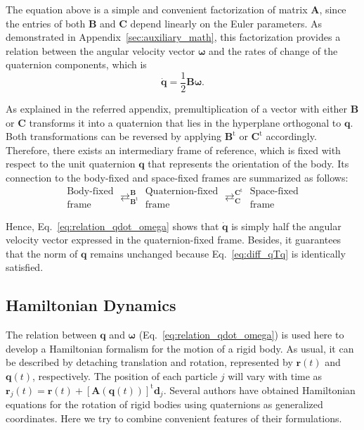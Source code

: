 \documentclass[aip,jcp,reprint,amsmath,amssymb]{revtex4-1}
\newcommand{\mt}[1]{\boldsymbol{\mathbf{#1}}}           %
\newcommand{\vt}[1]{\boldsymbol{\mathbf{#1}}}           %
\newcommand{\tr}[1]{#1^\text{t}}                        %
\begin{document}
The equation above is a simple and convenient factorization of matrix $\mt A$, since the entries of both $\mt B$ and $\mt C$ depend linearly on the Euler parameters. As demonstrated in Appendix~\ref{sec:auxiliary_math}, this factorization provides a relation between the angular velocity vector $\vt \omega$ and the rates of change of the quaternion components, which is
\begin{equation}
\label{eq:relation_qdot_omega}
\dot{\vt q} = \frac{1}{2} \mt B \vt \omega.
\end{equation}

As explained in the referred appendix, premultiplication of a vector with either $\mt B$ or $\mt C$ transforms it into a quaternion that lies in the hyperplane orthogonal to $\vt q$. Both transformations can be reversed by applying $\tr{\vt B}$ or $\tr{\vt C}$ accordingly. Therefore, there exists an intermediary frame of reference, which is fixed with respect to the unit quaternion $\vt q$ that represents the orientation of the body. Its connection to the body-fixed and space-fixed frames are summarized as follows:
\[
\boxed{\substack{\text{Body-fixed} \\ \text{frame}}}
\mathrel{\mathop{\rightleftarrows}^{\mt B}_{\tr{\mt B}}}
\boxed{\substack{\text{Quaternion-fixed} \\ \text{frame}}}
\mathrel{\mathop{\rightleftarrows}^{\tr{\mt C}}_{\mt C}}
\boxed{\substack{\text{Space-fixed} \\ \text{frame}}}
\]

Hence, Eq.~\ref{eq:relation_qdot_omega} shows that $\dot{\vt q}$ is simply half the angular velocity vector expressed in the quaternion-fixed frame. Besides, it guarantees that the norm of $\vt q$ remains unchanged because Eq.~\ref{eq:diff_qTq} is identically satisfied.

\subsection{Hamiltonian Dynamics}
\label{sec:hamiltonian}

The relation between $\vt q$ and $\vt \omega$ (Eq.~\ref{eq:relation_qdot_omega}) is used here to develop a Hamiltonian formalism for the motion of a rigid body. As usual, it can be described by detaching translation and rotation, represented by ${\vt r}(t)$ and ${\vt q}(t)$, respectively. The position of each particle $j$ will vary with time as $\vt r_j(t) = \vt r(t) + \tr{[{\mt A}(\vt q(t))]}\vt d_j$. Several authors have obtained Hamiltonian equations for the rotation of rigid bodies using quaternions as generalized coordinates.\cite{Maciejewski1985, Dichmann1996, Miller2002, Ravishankar2004, Nielsen2012} Here we try to combine convenient features of their formulations.
\end{document}
